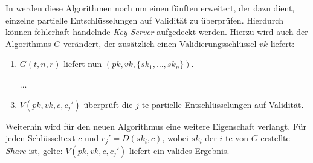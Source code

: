 In \cite{boneh2006} werden diese Algorithmen noch um einen fünften erweitert, der dazu dient, einzelne partielle Entschlüsselungen auf Validität zu überprüfen. Hierdurch können fehlerhaft handelnde \textit{Key-Server} aufgedeckt werden. Hierzu wird auch der Algorithmus \(G\) verändert, der zusätzlich einen Validierungsschlüssel \(vk\) liefert:
\begin{enumerate}
	\item \(G(t, n, r)\) liefert nun \((pk, vk, \{sk_1, \dots, sk_n\})\).
  \item[...] 
  \setcounter{enumi}{4}
	\item \(V(pk, vk, c, c_j')\) überprüft die \(j\)-te partielle Entschlüsselungen auf Validität.
\end{enumerate}

Weiterhin wird für den neuen Algorithmus eine weitere Eigenschaft verlangt. Für jeden Schlüsseltext \(c\) und \(c_j' = D(sk_i,c)\), wobei \(sk_i\) der \(i\)-te von \(G\) erstellte \textit{Share} ist, gelte: \(V(pk, vk, c, c_j')\) liefert ein valides Ergebnis.